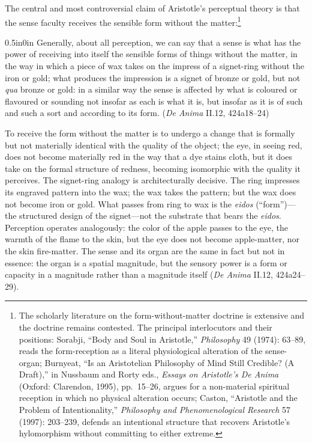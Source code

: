\documentclass{article}
\begin{document}
The central and most controversial claim of Aristotle's perceptual theory is that the sense faculty receives the sensible form without the matter:\footnote{The scholarly literature on the form-without-matter doctrine is extensive and the doctrine remains contested. The principal interlocutors and their positions: Sorabji, ``Body and Soul in Aristotle,'' \textit{Philosophy} 49 (1974): 63--89, reads the form-reception as a literal physiological alteration of the sense-organ; Burnyeat, ``Is an Aristotelian Philosophy of Mind Still Credible? (A Draft),'' in Nussbaum and Rorty eds., \textit{Essays on Aristotle's De Anima} (Oxford: Clarendon, 1995), pp.~15--26, argues for a non-material spiritual reception in which no physical alteration occurs; Caston, ``Aristotle and the Problem of Intentionality,'' \textit{Philosophy and Phenomenological Research} 57 (1997): 203--239, defends an intentional structure that recovers Aristotle's hylomorphism without committing to either extreme.}
\begin{adjustwidth}{0.5in}{0in}
Generally, about all perception, we can say that a sense is what has the power of receiving into itself the sensible forms of things without the matter, in the way in which a piece of wax takes on the impress of a signet-ring without the iron or gold; what produces the impression is a signet of bronze or gold, but not \textit{qua} bronze or gold: in a similar way the sense is affected by what is coloured or flavoured or sounding not insofar as each is what it is, but insofar as it is of such and such a sort and according to its form. (\textit{De Anima} II.12, 424a18--24)
\end{adjustwidth}
To receive the form without the matter is to undergo a change that is formally but not materially identical with the quality of the object; the eye, in seeing red, does not become materially red in the way that a dye stains cloth, but it does take on the formal structure of redness, becoming isomorphic with the quality it perceives. The signet-ring analogy is architecturally decisive. The ring impresses its engraved pattern into the wax; the wax takes the pattern; but the wax does not become iron or gold. What passes from ring to wax is the \textit{eidos} (``form'')---the structured design of the signet---not the substrate that bears the \textit{eidos}. Perception operates analogously: the color of the apple passes to the eye, the warmth of the flame to the skin, but the eye does not become apple-matter, nor the skin fire-matter. The sense and its organ are the same in fact but not in essence: the organ is a spatial magnitude, but the sensory power is a form or capacity in a magnitude rather than a magnitude itself (\textit{De Anima} II.12, 424a24--29).
\end{document}
